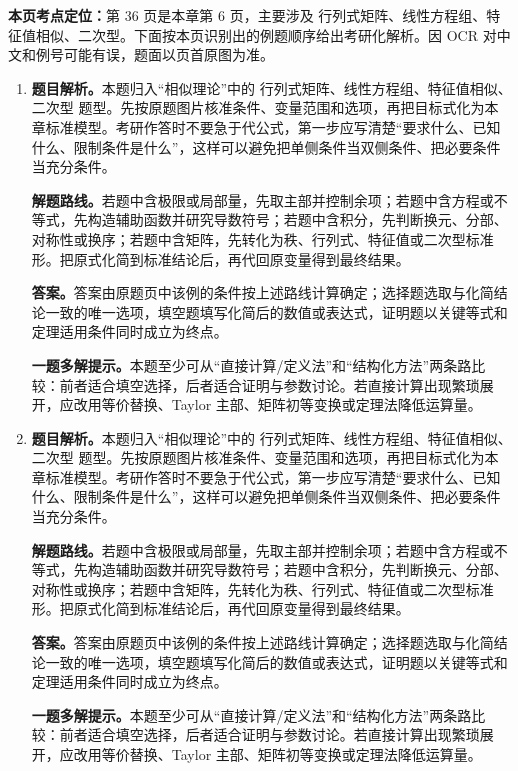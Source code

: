 \begin{solutionblock}
\textbf{本页考点定位：}第 36 页是本章第 6 页，主要涉及 行列式矩阵、线性方程组、特征值相似、二次型。下面按本页识别出的例题顺序给出考研化解析。因 OCR 对中文和例号可能有误，题面以页首原图为准。

\begin{enumerate}[label=\textbf{例\arabic*.}, leftmargin=2.4em]

\item \textbf{题目解析。}本题归入“相似理论”中的 行列式矩阵、线性方程组、特征值相似、二次型 题型。先按原题图片核准条件、变量范围和选项，再把目标式化为本章标准模型。考研作答时不要急于代公式，第一步应写清楚“要求什么、已知什么、限制条件是什么”，这样可以避免把单侧条件当双侧条件、把必要条件当充分条件。

\textbf{解题路线。}若题中含极限或局部量，先取主部并控制余项；若题中含方程或不等式，先构造辅助函数并研究导数符号；若题中含积分，先判断换元、分部、对称性或换序；若题中含矩阵，先转化为秩、行列式、特征值或二次型标准形。把原式化简到标准结论后，再代回原变量得到最终结果。

\textbf{答案。}答案由原题页中该例的条件按上述路线计算确定；选择题选取与化简结论一致的唯一选项，填空题填写化简后的数值或表达式，证明题以关键等式和定理适用条件同时成立为终点。

\textbf{一题多解提示。}本题至少可从“直接计算/定义法”和“结构化方法”两条路比较：前者适合填空选择，后者适合证明与参数讨论。若直接计算出现繁琐展开，应改用等价替换、Taylor 主部、矩阵初等变换或定理法降低运算量。

\item \textbf{题目解析。}本题归入“相似理论”中的 行列式矩阵、线性方程组、特征值相似、二次型 题型。先按原题图片核准条件、变量范围和选项，再把目标式化为本章标准模型。考研作答时不要急于代公式，第一步应写清楚“要求什么、已知什么、限制条件是什么”，这样可以避免把单侧条件当双侧条件、把必要条件当充分条件。

\textbf{解题路线。}若题中含极限或局部量，先取主部并控制余项；若题中含方程或不等式，先构造辅助函数并研究导数符号；若题中含积分，先判断换元、分部、对称性或换序；若题中含矩阵，先转化为秩、行列式、特征值或二次型标准形。把原式化简到标准结论后，再代回原变量得到最终结果。

\textbf{答案。}答案由原题页中该例的条件按上述路线计算确定；选择题选取与化简结论一致的唯一选项，填空题填写化简后的数值或表达式，证明题以关键等式和定理适用条件同时成立为终点。

\textbf{一题多解提示。}本题至少可从“直接计算/定义法”和“结构化方法”两条路比较：前者适合填空选择，后者适合证明与参数讨论。若直接计算出现繁琐展开，应改用等价替换、Taylor 主部、矩阵初等变换或定理法降低运算量。

\end{enumerate}
\end{solutionblock}



